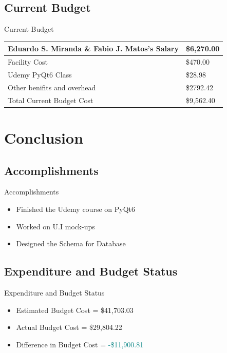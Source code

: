 \documentclass[17pt, aspectratio=169]{beamer}
\begin{document}
\subsection*{Current Budget}
\begin{frame}{Current Budget}
	\begin{center}
		\begin{tabular}{||m{} | m{} ||}
			\hline
			Eduardo S. Miranda \& Fabio J. Matos's Salary                  & \$6,270.00 \\
			\hline
			Facility Cost                                                  & \$470.00   \\
			\hline
			Udemy PyQt6 Class & \$28.98    \\
			\hline
			Other benifits and overhead & \$2792.42 \\
			\hline
			Total Current Budget Cost                                      & \$9,562.40  \\
			\hline
		\end{tabular}
	\end{center}
\end{frame}
\section{Conclusion}
\subsection{Accomplishments}
\begin{frame}{Accomplishments}
	\begin{itemize}
		\item Finished the Udemy course on PyQt6
		\item Worked on U.I mock-ups
		\item Designed the Schema for Database
	\end{itemize}
\end{frame}
\subsection*{Expenditure and Budget Status}
\begin{frame}{Expenditure and Budget Status}
	\begin{itemize}
		\item Estimated Budget Cost = \$41,703.03
		\item Actual Budget Cost = \$29,804.22
		\item Difference in Budget Cost = \textcolor{teal}{-\$11,900.81}
	\end{itemize}
\end{frame}
\end{document}
